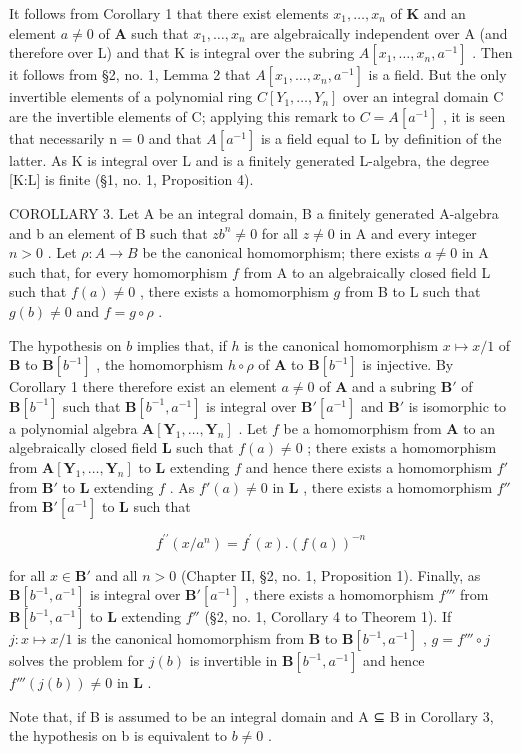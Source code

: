 It follows from Corollary 1 that there exist elements \(x_{1}, \ldots, x_{n}\) of \(\mathbf{K}\) and an element \(a \neq 0\) of \(\mathbf{A}\) such that \(x_{1}, \ldots, x_{n}\) are algebraically independent over A (and therefore over L) and that K is integral over the subring \(A[x_{1},\ldots,x_{n},a^{-1}]\) . Then it follows from §2, no. 1, Lemma 2 that \(A[x_{1},\ldots,x_{n},a^{-1}]\) is a field. But the only invertible elements of a polynomial ring \(C[Y_{1},\ldots,Y_{n}]\) over an integral domain C are the invertible elements of C; applying this remark to \(C = A[a^{-1}]\) , it is seen that necessarily n = 0 and that \(A[a^{-1}]\) is a field equal to L by definition of the latter. As K is integral over L and is a finitely generated L-algebra, the degree {[}K:L{]} is finite (§1, no. 1, Proposition 4).

COROLLARY 3. Let A be an integral domain, B a finitely generated A-algebra and b an element of B such that \(zb^n \neq 0\) for all \(z \neq 0\) in A and every integer \(n > 0\) . Let \(\rho: A \to B\) be the canonical homomorphism; there exists \(a \neq 0\) in A such that, for every homomorphism \(f\) from A to an algebraically closed field L such that \(f(a) \neq 0\) , there exists a homomorphism \(g\) from B to L such that \(g(b) \neq 0\) and \(f = g \circ \rho\) .

The hypothesis on \(b\) implies that, if \(h\) is the canonical homomorphism \(x \mapsto x / 1\) of \(\mathbf{B}\) to \(\mathbf{B}[b^{-1}]\) , the homomorphism \(h \circ \rho\) of \(\mathbf{A}\) to \(\mathbf{B}[b^{-1}]\) is injective. By Corollary 1 there therefore exist an element \(a \neq 0\) of \(\mathbf{A}\) and a subring \(\mathbf{B}'\) of \(\mathbf{B}[b^{-1}]\) such that \(\mathbf{B}[b^{-1}, a^{-1}]\) is integral over \(\mathbf{B}'[a^{-1}]\) and \(\mathbf{B}'\) is isomorphic to a polynomial algebra \(\mathbf{A}[\mathbf{Y}_1, \ldots, \mathbf{Y}_n]\) . Let \(f\) be a homomorphism from \(\mathbf{A}\) to an algebraically closed field \(\mathbf{L}\) such that \(f(a) \neq 0\) ; there exists a homomorphism from \(\mathbf{A}[\mathbf{Y}_1, \ldots, \mathbf{Y}_n]\) to \(\mathbf{L}\) extending \(f\) and hence there exists a homomorphism \(f'\) from \(\mathbf{B}'\) to \(\mathbf{L}\) extending \(f\) . As \(f'(a) \neq 0\) in \(\mathbf{L}\) , there exists a homomorphism \(f''\) from \(\mathbf{B}'[a^{-1}]\) to \(\mathbf{L}\) such that

\[
f ^ {\prime \prime} (x / a ^ {n}) = f ^ {\prime} (x). (f (a)) ^ {- n}
\]

for all \(x \in \mathbf{B}'\) and all \(n > 0\) (Chapter II, §2, no. 1, Proposition 1). Finally, as \(\mathbf{B}[b^{-1}, a^{-1}]\) is integral over \(\mathbf{B}'[a^{-1}]\) , there exists a homomorphism \(f'''\) from \(\mathbf{B}[b^{-1}, a^{-1}]\) to \(\mathbf{L}\) extending \(f''\) (§2, no. 1, Corollary 4 to Theorem 1). If \(j: x \mapsto x / 1\) is the canonical homomorphism from \(\mathbf{B}\) to \(\mathbf{B}[b^{-1}, a^{-1}]\) , \(g = f''' \circ j\) solves the problem for \(j(b)\) is invertible in \(\mathbf{B}[b^{-1}, a^{-1}]\) and hence \(f'''(j(b)) \neq 0\) in \(\mathbf{L}\) .

Note that, if B is assumed to be an integral domain and A ⊆ B in Corollary 3, the hypothesis on b is equivalent to \(b \neq 0\) .

